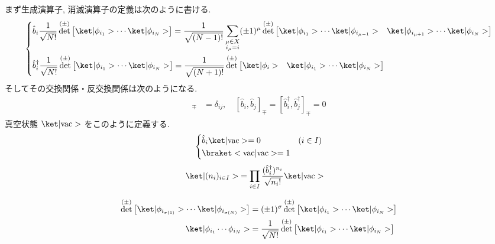 \documentclass[uplatex,dvipdfmx,a4paper,11pt]{jlreq}
\DeclareMathOperator{\Det}{det}
\numberwithin{equation}{section}
\theoremstyle{definition}
\begin{document}
まず生成演算子, 消滅演算子の定義は次のように書ける.
\begin{align}
  \begin{dcases}
    \hat{b}_i\frac{1}{\sqrt{N!}}\Det^{(\pm)}\begin{bmatrix}\ket|\phi_{i_1}> \cdots \ket|\phi_{i_N}>\end{bmatrix} = \frac{1}{\sqrt{(N-1)!}}\sum_{\substack{\mu\in X \\ i_\mu = i}}(\pm1)^\mu\Det^{(\pm)}\begin{bmatrix}\ket|\phi_{i_1}> \cdots \ket|\phi_{i_{\mu-1}}> & \ket|\phi_{i_{\mu+1}}>\cdots\ket|\phi_{i_N}>\end{bmatrix} \\
    \hat{b}_i^\dagger\frac{1}{\sqrt{N!}}\Det^{(\pm)}\begin{bmatrix}\ket|\phi_{i_1}> \cdots \ket|\phi_{i_N}>\end{bmatrix} = \frac{1}{\sqrt{(N+1)!}}\Det^{(\pm)}\begin{bmatrix}\ket|\phi_i> & \ket|\phi_{i_1}> \cdots \ket|\phi_{i_N}>\end{bmatrix}
  \end{dcases}
\end{align}
そしてその交換関係・反交換関係は次のようになる.
\begin{align}
  [\hat{b}_i, \hat{b}_j^\dagger]_\mp & = \delta_{ij}, \quad [\hat{b}_i, \hat{b}_j]_\mp = [\hat{b}_i^\dagger, \hat{b}_j^\dagger]_\mp = 0
\end{align}
真空状態 $\ket|\mathrm{vac}>$ をこのように定義する.
\begin{align}
  \begin{dcases}
    \hat{b}_i\ket|\mathrm{vac}> = 0 & (i\in I) \\
    \braket<\mathrm{vac}|\mathrm{vac}> = 1
  \end{dcases}
\end{align}
\begin{align}
  \ket|(n_i)_{i\in I}> & = \prod_{i\in I}\frac{(\hat{b}_i^\dagger)^{n_i}}{\sqrt{n_i!}}\ket|\mathrm{vac}>
\end{align}

\begin{align}
  \Det^{(\pm)}\begin{bmatrix}\ket|\phi_{i_{\sigma(1)}}> \cdots \ket|\phi_{i_{\sigma(N)}}>\end{bmatrix} & = (\pm 1)^\sigma\Det^{(\pm)}\begin{bmatrix}\ket|\phi_{i_1}> \cdots \ket|\phi_{i_N}>\end{bmatrix}    \\
  \ket|\phi_{i_1}\cdots\phi_{i_N}>                                                                                                       & = \frac{1}{\sqrt{N!}}\Det^{(\pm)}\begin{bmatrix}\ket|\phi_{i_1}>\cdots\ket|\phi_{i_N}>\end{bmatrix}
\end{align}
\end{document}
